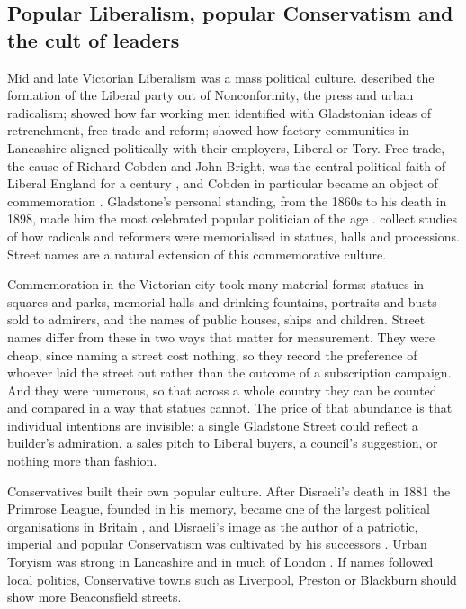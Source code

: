 \documentclass[11pt,a4paper]{article}
\begin{document}
\subsection{Popular Liberalism, popular Conservatism and the cult of leaders}
Mid and late Victorian Liberalism was a mass political culture. \citet{vincent1966} described the formation of the Liberal party out of Nonconformity, the press and urban radicalism; \citet{biagini1992} showed how far working men identified with Gladstonian ideas of retrenchment, free trade and reform; \citet{joyce1980} showed how factory communities in Lancashire aligned politically with their employers, Liberal or Tory. Free trade, the cause of Richard Cobden and John Bright, was the central political faith of Liberal England for a century \citep{howe1997,trentmann2008}, and Cobden in particular became an object of commemoration \citep{hinde1987}. Gladstone's personal standing, from the 1860s to his death in 1898, made him the most celebrated popular politician of the age \citep{matthew1986,parry1986}. \citet{pickering2004} collect studies of how radicals and reformers were memorialised in statues, halls and processions. Street names are a natural extension of this commemorative culture.

Commemoration in the Victorian city took many material forms: statues in squares and parks, memorial halls and drinking fountains, portraits and busts sold to admirers, and the names of public houses, ships and children. Street names differ from these in two ways that matter for measurement. They were cheap, since naming a street cost nothing, so they record the preference of whoever laid the street out rather than the outcome of a subscription campaign. And they were numerous, so that across a whole country they can be counted and compared in a way that statues cannot. The price of that abundance is that individual intentions are invisible: a single Gladstone Street could reflect a builder's admiration, a sales pitch to Liberal buyers, a council's suggestion, or nothing more than fashion.

Conservatives built their own popular culture. After Disraeli's death in 1881 the Primrose League, founded in his memory, became one of the largest political organisations in Britain \citep{pugh1985}, and Disraeli's image as the author of a patriotic, imperial and popular Conservatism was cultivated by his successors \citep{parry2000}. Urban Toryism was strong in Lancashire and in much of London \citep{lawrence1998,windscheffel2007}. If names followed local politics, Conservative towns such as Liverpool, Preston or Blackburn should show more Beaconsfield streets.
\end{document}
